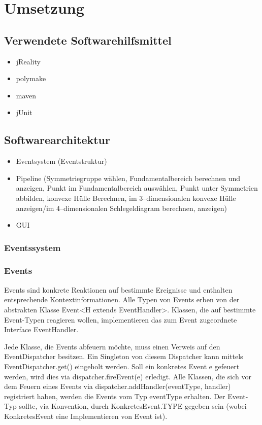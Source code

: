 \section{Umsetzung}

\subsection{Verwendete Softwarehilfsmittel}
    \begin{itemize}
        \item jReality
        \item polymake
        \item maven
        \item jUnit
    \end{itemize}
    
\subsection{Softwarearchitektur}
    \begin{itemize}
        \item Eventsystem (Eventstruktur)
        \item Pipeline (Symmetriegruppe wählen, Fundamentalbereich berechnen und anzeigen, Punkt im Fundamentalbereich auswählen, Punkt unter Symmetrien abbilden, konvexe Hülle Berechnen, im 3--dimensionalen konvexe Hülle anzeigen/im 4--dimensionalen Schlegeldiagram berechnen, anzeigen)
        \item GUI
    \end{itemize}
    \subsubsection{Eventssystem}
        \subsubsection*{Events}
            Events sind konkrete Reaktionen auf bestimmte Ereignisse und enthalten entsprechende Kontextinformationen. Alle Typen von Events erben von der abstrakten Klasse Event<H extends EventHandler>. Klassen, die auf bestimmte Event-Typen reagieren wollen, implementieren das zum Event zugeordnete Interface EventHandler.

            Jede Klasse, die Events abfeuern möchte, muss einen Verweis auf den EventDispatcher besitzen. Ein Singleton von diesem Dispatcher kann mittels EventDispatcher.get() eingeholt werden. Soll ein konkretes Event e gefeuert werden, wird dies via dispatcher.fireEvent(e) erledigt. Alle Klassen, die sich vor dem Feuern eines Events via dispatcher.addHandler(eventType, handler) registriert haben, werden die Events vom Typ eventType erhalten. Der Event-Typ sollte, via Konvention, durch KonkretesEvent.TYPE gegeben sein (wobei KonkretesEvent eine Implementieren von Event ist).
